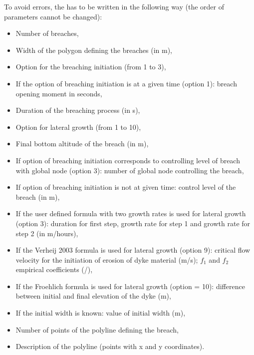 To avoid errors, the  has to be written in the
following way (the order of parameters cannot be changed):
\begin{itemize}
\item Number of breaches,
\item Width of the polygon defining the breaches (in m),
\item Option for the breaching initiation (from 1 to 3),
\item If the option of breaching initiation is at a given time (option 1):
breach opening moment in seconds,
\item Duration of the breaching process (in s),
\item Option for lateral growth (from 1 to 10),
\item Final bottom altitude of the breach (in m),
\item If option of breaching initiation corresponds to controlling level of
breach with global node (option 3): number of global node controlling the breach,
\item If option of breaching initiation is not at given time: control level of
the breach (in m),
\item If the user defined formula with two growth rates is used for lateral
growth (option 3): duration for first step, growth rate for step 1 and growth
rate for step 2 (in m/hours),
\item If the Verheij 2003 formula is used for lateral growth (option 9):
critical flow velocity for the initiation of erosion of dyke material (m/s);
$f_1$ and $f_2$ empirical coefficients (/),
\item If the Froehlich formula is used for lateral growth (option = 10):
difference between initial and final elevation of the dyke (m),
\item If the initial width is known: value of initial width (m),
\item Number of points of the polyline defining the breach,
\item Description of the polyline (points with x and y coordinates).
\end{itemize}

%
%
%

